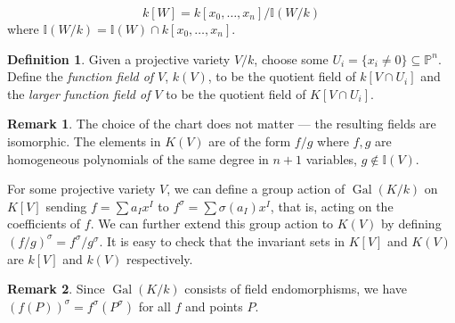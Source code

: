 \documentclass[12pt]{article}
\theoremstyle{remark}
\theoremstyle{definition}
\newtheorem{remark}{Remark}[subsection]
\newtheorem{definition}{Definition}[subsection]
\newcommand{\s}[0]{\sigma}
\newcommand{\Gal}[0]{\operatorname{Gal}}
\begin{document}
            \[k[W]=k[x_0,\dots,x_n]/\mathbb I(W/k)\]
            where $\mathbb I(W/k)=\mathbb I(W)\cap k[x_0,\dots,x_n]$.
            \begin{definition}
                Given a projective variety $V/k$, choose some $U_i=\{x_i\neq 0\}\subseteq \mathbb P^n$. Define the \textit{function field of $V$}, $k(V)$, to be the quotient field of $k[V\cap U_i]$ and the \textit{larger function field of $V$} to be the quotient field of $K[V\cap U_i]$.
            \end{definition}
            \begin{remark}
                The choice of the chart does not matter --- the resulting fields are isomorphic. The elements in $K(V)$ are of the form $f/g$ where $f, g$ are homogeneous polynomials of the same degree in $n+1$ variables, $g\notin\mathbb I(V)$.
            \end{remark}
            For some projective variety $V$, we can define a group action of $\Gal(K/k)$ on $K[V]$ sending $f=\sum a_{I}x^I$ to $f^\s=\sum \s(a_I)x^I$, that is, acting on the coefficients of $f$. We can further extend this group action to $K(V)$ by defining $(f/g)^\s=f^\s/g^\s$. It is easy to check that the invariant sets in $K[V]$ and $K(V)$ are $k[V]$ and $k(V)$ respectively.
            \begin{remark}\label{remark-gal-on-rational}
                Since $\Gal(K/k)$ consists of field endomorphisms, we have $(f(P))^\s=f^\s(P^\s)$ for all $f$ and points $P$.
            \end{remark}
            
\end{document}
